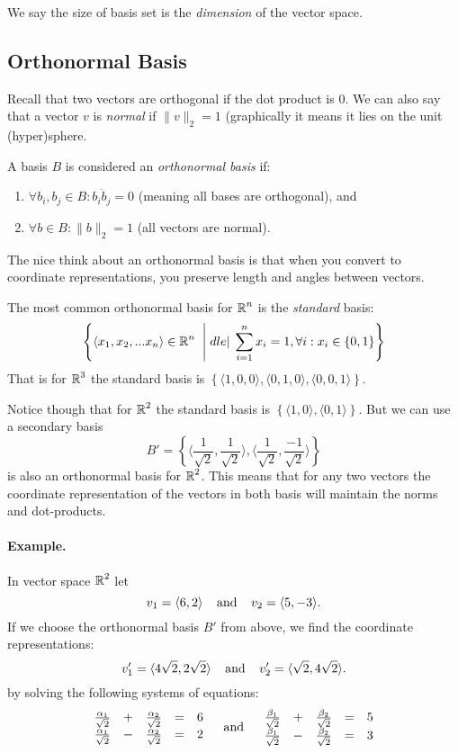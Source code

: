We say the size of basis set is the \emph{dimension} of the vector space. 

\subsection{Orthonormal Basis}
Recall that two vectors are orthogonal if the dot product is 0. 
We can also say that a vector $v$ is \emph{normal} if $\|v\|_2=1$ (graphically it means it lies on the unit (hyper)sphere. 

A basis $B$ is considered an \emph{orthonormal basis} if:
\begin{enumerate}
\item $\forall b_i, b_j\in B: b_i \dot b_j = 0$ (meaning all bases are orthogonal), and 
\item $\forall b \in B : \|b\|_2=1$ (all vectors are normal). 
\end{enumerate}

The nice think about an orthonormal basis is that when you convert to coordinate representations, you preserve length and angles between vectors. 

The most common orthonormal basis for $\operatorname{\mathbb{R}}^n$ is the \emph{standard} basis: 
\[\left\{\left\langle x_1, x_2, ... x_n\right\rangle \in \operatorname{\mathbb{R}}^n \;\;\middle|\;dle|\; \sum_{i=1}^n x_i = 1, \forall i : x_i \in \left\{0,1\right\}\right\}\]
That is for $\operatorname{\mathbb{R}}^3$ the standard basis is $\left\{\langle1,0,0\rangle,\langle0,1,0\rangle,\langle0,0,1\rangle\right\}$.

Notice though that for $\operatorname{\mathbb{R}}^2$ the standard basis is $\left\{\langle1,0\rangle,\langle0,1\rangle\right\}$.
But we can use a secondary basis \[B'=\left\{\langle\frac{1}{\sqrt{2}},\frac{1}{\sqrt{2}}\rangle,\langle\frac{1}{\sqrt{2}},\frac{-1}{\sqrt{2}}\rangle\right\}\] is also an orthonormal basis for $\operatorname{\mathbb{R}}^2$. 
This means that for any two vectors the coordinate representation of the vectors in both basis will maintain the norms and dot-products. 

\paragraph{Example.}
In vector space $\operatorname{\mathbb{R}}^2$ let \[v_1 = \langle6,2\rangle\;\;\;\;\textnormal{and}\;\;\;\; v_2 = \langle5,-3\rangle.\]
If we choose the orthonormal basis  $B'$ from above, 
we find the coordinate representations:
\[
v'_1 = \langle4\sqrt{2},2\sqrt{2}\rangle \;\;\;\;\textnormal{and}\;\;\;\; v'_2 = \langle\sqrt{2},4\sqrt{2}\rangle.
\]
by solving the following systems of equations: 
\[
\begin{array}{rcrcr}
\frac{\alpha_1}{\sqrt{2}} &+& \frac{\alpha_2}{\sqrt{2}} &=& 6\\
\frac{\alpha_1}{\sqrt{2}} &-& \frac{\alpha_2}{\sqrt{2}} &=& 2\\ 
\end{array} \;\;\;\;\textnormal{and}\;\;\;\; \begin{array}{rcrcr}
\frac{\beta_1}{\sqrt{2}} &+& \frac{\beta_2}{\sqrt{2}} &=& 5\\
\frac{\beta_1}{\sqrt{2}} &-& \frac{\beta_2}{\sqrt{2}} &=& 3\\ 
\end{array}\]

